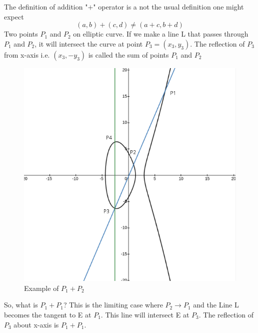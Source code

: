 \documentclass[12pt,a4paper]{report}
\begin{document}
The definition of addition "$+$" operator is a not the usual definition one might expect 
$$(a,b)+(c,d) \neq (a+c,b+d)$$
Two points $P_1$ and $P_2$ on elliptic curve. If we make a line L that passes through $P_1$ and $P_2$, it will intersect the curve at point $P_3=(x_3,y_3)$. The reflection of $P_3$ from x-axis i.e. $(x_3,-y_3)$ is called the sum of points $P_1$ and $P_2$
\begin{figure}[h!]
\begin{center}
\caption{Example of $P_1+P_2$}
\includegraphics[scale=0.4]{2}
\end{center}
\end{figure}
\cleardoublepage
So, what is $P_1+P_1$? This is the limiting case where $P_2 \to P_1$ and the Line L becomes the tangent to E at $P_1$. This line will intersect E at $P_3$. The reflection of $P_3$ about x-axis  is $P_1+P_1$.
\end{document}
